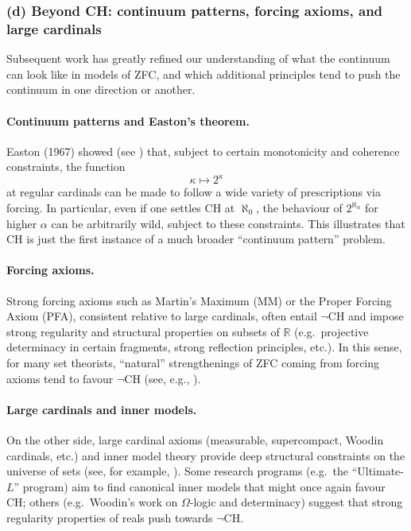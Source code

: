 \documentclass[11pt]{book}
\theoremstyle{plain}
\theoremstyle{definition}
\begin{document}
\subsubsection*{(d) Beyond CH: continuum patterns, forcing axioms, and large cardinals}

Subsequent work has greatly refined our understanding of what the
continuum can look like in models of ZFC, and which additional
principles tend to push the continuum in one direction or another.

\paragraph{Continuum patterns and Easton’s theorem.}

Easton (1967) showed (see \cite{Easton1970,Jech2003}) that, subject to certain monotonicity and
coherence constraints, the function
\[
   \kappa \mapsto 2^\kappa
\]
at regular cardinals can be made to follow a wide variety of
prescriptions via forcing. In particular, even if one settles CH at
$\aleph_0$, the behaviour of $2^{\aleph_\alpha}$ for higher $\alpha$
can be arbitrarily wild, subject to these constraints. This illustrates
that CH is just the first instance of a much broader “continuum
pattern” problem.

\paragraph{Forcing axioms.}

Strong forcing axioms such as Martin’s Maximum (MM) or the Proper
Forcing Axiom (PFA), consistent relative to large cardinals, often
entail $\neg\text{CH}$ and impose strong regularity and structural
properties on subsets of $\mathbb{R}$ (e.g.\ projective determinacy in
certain fragments, strong reflection principles, etc.). In this sense,
for many set theorists, “natural” strengthenings of ZFC coming from
forcing axioms tend to favour $\neg\text{CH}$ (see, e.g., \cite{Jech2003,Kanamori2003}).

\paragraph{Large cardinals and inner models.}

On the other side, large cardinal axioms (measurable, supercompact,
Woodin cardinals, etc.) and inner model theory provide deep structural
constraints on the universe of sets (see, for example, \cite{Kanamori2003}). Some research programs (e.g.\ the
“Ultimate-$L$” program) aim to find canonical inner models that might
once again favour CH; others (e.g.\ Woodin’s work on $\Omega$-logic and
determinacy) suggest that strong regularity properties of reals push
towards $\neg\text{CH}$.
\end{document}

